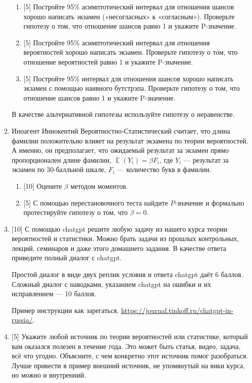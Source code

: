 \documentclass[12pt]{article} %
\DeclareMathOperator{\E}{\mathbb{E}}
\begin{document}
\begin{enumerate}
  \begin{enumerate}
    \item {[5]} Постройте 95\% асимптотический интервал для отношения шансов хорошо написать экзамен («несогласных» к «согласным»).
    Проверьте гипотезу о том, что отношение шансов равно 1 и укажите P-значение.
    \item {[5]} Постройте 95\% асимптотический интервал для отношения вероятностей хорошо написать экзамен. 
    Проверьте гипотезу о том, что отношение вероятностей равно 1 и укажите P-значение.
    \item {[5]} Постройте 95\% интервал для отношения шансов хорошо написать экзамен 
    с помощью наивного бутстрэпа. Проверьте гипотезу о том, что отношение шансов равно 1 и укажите P-значение.
  \end{enumerate}
  В качестве альтернативной гипотезы используйте гипотезу о неравенстве. 



    \item Иноагент Иннокентий Вероятностно-Статистический считает, что длина фамилии положительно влияет 
    на результат экзамена по теории вероятностей. 
    А именно, он предполагает, что ожидаемый результат за экзамен прямо пропорционален длине фамилии,
    $\E(Y_i) = \beta F_i$, где $Y_i$ — результат за экзамен по 30-балльной шкале, 
    $F_i$ — количество букв в фамилии. 

    \begin{enumerate}
      \item {[10]} Оцените $\beta$ методом моментов. 
      \item {[5]} С помощью перестановочного теста найдите $P$-значение и формально протестируйте гипотезу о том, что $\beta = 0$.
    \end{enumerate}


    \item {[10]} С помощью chatgpt решите любую задачу из нашего курса теории вероятностей и статистики. 
    Можно брать задачи из прошлых контрольных, лекций, семинаров и даже этого домашнего задания.
    В качестве ответа приведите полный диалог с chatgpt. 
 
    Простой диалог в виде двух реплик условия и ответа chatgpt даёт 6 баллов. 
    Сложный диалог с наводками, указанием chatgpt на ошибки и их исправлением — 10 баллов. 
 
    Пример инструкции как зарегаться, \url{https://journal.tinkoff.ru/chatgpt-in-russia/}.
 


    \item {[5]} Укажите любой источник по теории вероятностей или статистике, который вам оказался полезен 
    в течение года. 
    Это может быть статья, видео, задача, всё что угодно. Объясните, с чем конкретно этот источник помог 
    разобраться. Лучше привести в пример внешний источник, не упомянутый на вики курса,
    но можно и внутренний. 
    

\end{enumerate}
\end{document}
